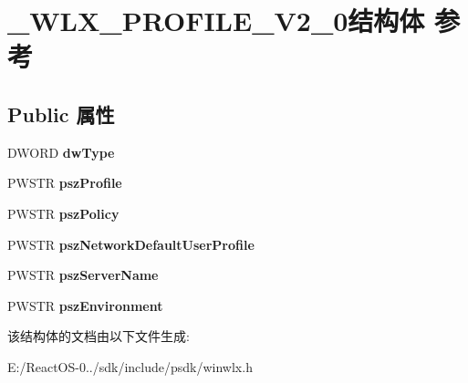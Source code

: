 \hypertarget{struct___w_l_x___p_r_o_f_i_l_e___v2__0}{}\section{\+\_\+\+W\+L\+X\+\_\+\+P\+R\+O\+F\+I\+L\+E\+\_\+\+V2\+\_\+0结构体 参考}
\label{struct___w_l_x___p_r_o_f_i_l_e___v2__0}
\subsection*{Public 属性}
\begin{DoxyCompactItemize}
\item 
\mbox{\label{struct___w_l_x___p_r_o_f_i_l_e___v2__0_a09b7f1b93ae7e3aad853b0723fd254bf}} 
D\+W\+O\+RD {\bfseries dw\+Type}
\item 
\mbox{\label{struct___w_l_x___p_r_o_f_i_l_e___v2__0_ab228002456a65c64366b896ac78aa618}} 
P\+W\+S\+TR {\bfseries psz\+Profile}
\item 
\mbox{\label{struct___w_l_x___p_r_o_f_i_l_e___v2__0_a126788800b42fcea45919115118596eb}} 
P\+W\+S\+TR {\bfseries psz\+Policy}
\item 
\mbox{\label{struct___w_l_x___p_r_o_f_i_l_e___v2__0_af00108045d4a1149e76164bb80186b72}} 
P\+W\+S\+TR {\bfseries psz\+Network\+Default\+User\+Profile}
\item 
\mbox{\label{struct___w_l_x___p_r_o_f_i_l_e___v2__0_a9ab29066507c7e03c49aa5087a42513d}} 
P\+W\+S\+TR {\bfseries psz\+Server\+Name}
\item 
\mbox{\label{struct___w_l_x___p_r_o_f_i_l_e___v2__0_a88b7a132358686be522279e03e1b6743}} 
P\+W\+S\+TR {\bfseries psz\+Environment}
\end{DoxyCompactItemize}


该结构体的文档由以下文件生成\+:\begin{DoxyCompactItemize}
\item 
E\+:/\+React\+O\+S-\/0../sdk/include/psdk/winwlx.\+h\end{DoxyCompactItemize}
